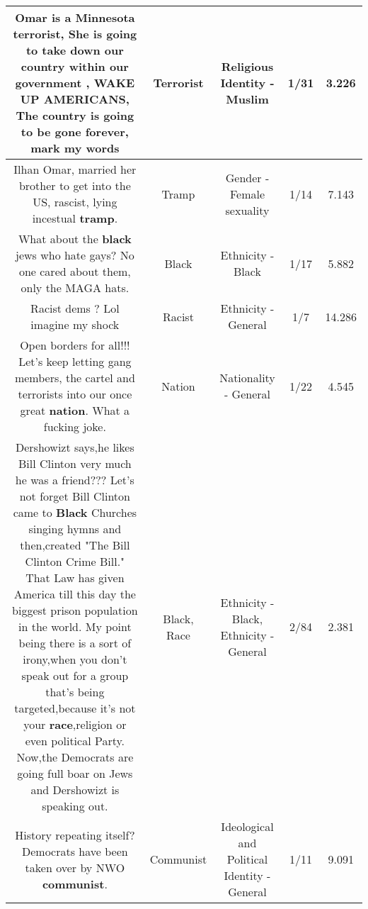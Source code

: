 \documentclass[11pt]{article}
\newlength\mylength
\begin{document}
\begin{center}
\begin{longtable}{|C{.65\mylength}|C{.30\mylength}|C{.12\mylength}|C{.12\mylength}|C{.12\mylength}|}
  \small Omar is a Minnesota \textbf{terrorist}, She is going to take down our country within our government , WAKE UP AMERICANS, The country is going to be gone forever, mark my words\normalsize   & Terrorist & Religious Identity - Muslim & 1/31 & 3.226 \\  \hline
  \small Ilhan Omar, married her brother to get into the US, rascist, lying incestual \textbf{tramp}.\normalsize   & Tramp & Gender - Female sexuality & 1/14 & 7.143 \\  \hline
  \small What about the \textbf{black} jews who hate gays? No one cared about them, only the MAGA hats.\normalsize   & Black & Ethnicity - Black & 1/17 & 5.882 \\  \hline
  \small Racist dems ? Lol imagine my shock\normalsize   & Racist & Ethnicity - General & 1/7 & 14.286 \\  \hline
  \small Open borders for all!!! Let's keep letting gang members, the cartel and terrorists into our once great \textbf{nation}. What a fucking joke.\normalsize   & Nation & Nationality - General & 1/22 & 4.545 \\  \hline
  \small Dershowizt says,he likes Bill Clinton very much he was a friend??? Let's not forget Bill Clinton came to \textbf{Black} Churches singing hymns and then,created "The Bill Clinton Crime Bill." That Law has given America till this day the biggest prison population in the world. My point being there is a sort of irony,when you don't speak out for a group that's being targeted,because it's not your \textbf{race},religion or even political Party. Now,the Democrats are going full boar on Jews and Dershowizt is speaking out.\normalsize   & Black, Race & Ethnicity - Black, Ethnicity - General & 2/84 & 2.381 \\  \hline
  \small History repeating itself?  Democrats have been taken over by NWO \textbf{communist}.\normalsize   & Communist &  Ideological and Political Identity - General & 1/11 & 9.091 \\  \hline

\end{longtable}
\end{center}
\end{document}
